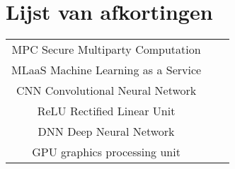 \chapter*{Lijst van afkortingen}
\begin{table}[!h]
	\begin{tabular}{cll}
		MPC				Secure Multiparty Computation\\
		MLaaS			Machine Learning as a Service\\
		CNN				Convolutional Neural Network\\
		ReLU			Rectified Linear Unit\\
		DNN 			Deep Neural Network\\
		GPU 			graphics processing unit\\
	\end{tabular}
\end{table}
